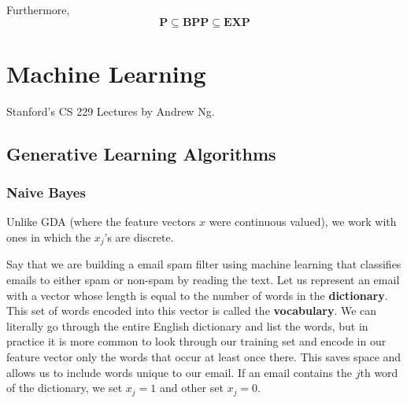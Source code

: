 \documentclass[a4paper, 12pt]{report}
\theoremstyle{remark}
\theoremstyle{definition}
\begin{document}
Furthermore, 
\[\mathbf{P \subseteq BPP \subseteq EXP}\]


\chapter{Machine Learning}
Stanford's CS 229 Lectures by Andrew Ng. 
\section{Generative Learning Algorithms}

\subsection{Naive Bayes}
Unlike GDA (where the feature vectors $x$ were continuous valued), we work with ones in which the $x_j$'s are discrete. 

Say that we are building a email spam filter using machine learning that classifies emails to either spam or non-spam by reading the text. Let us represent an email with a vector whose length is equal to the number of words in the \textbf{dictionary}. This set of words encoded into this vector is called the \textbf{vocabulary}. We can literally go through the entire English dictionary and list the words, but in practice it is more common to look through our training set and encode in our feature vector only the words that occur at least once there. This saves space and allows us to include words unique to our email. If an email contains the $j$th word of the dictionary, we set $x_j = 1$ and other set $x_j = 0$. 
\end{document}
